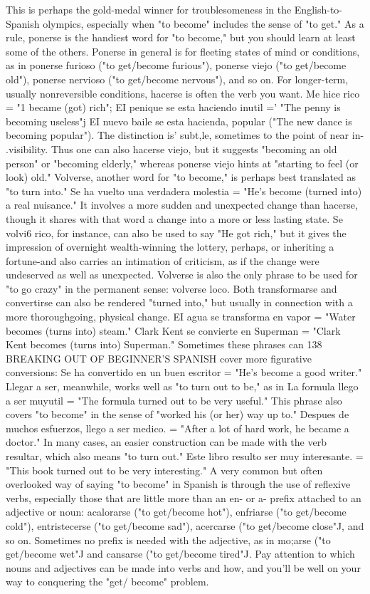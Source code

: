 This is perhaps the gold-medal winner for troublesomeness
in the English-to-Spanish olympics, especially when "to become" includes the sense of "to get." As a rule, ponerse is the handiest word for
"to become," but you should learn at least some of the others. Ponerse
in general is for fleeting states of mind or conditions, as in ponerse furioso ("to get/become furious"), ponerse viejo ("to get/become old"),
ponerse nervioso ("to get/become nervous"), and so on.
For longer-term, usually nonreversible conditions, hacerse is
often the verb you want. Me hice rico = "1 became (got) rich"; EI penique se esta haciendo inutil =' "The penny is becoming useless"j EI
nuevo baile se esta hacienda, popular ("The new dance is becoming
popular"). The distinction is' subt,le, sometimes to the point of near in-
.visibility. Thus one can also hacerse viejo, but it suggests "becoming
an old person" or "becoming elderly," whereas ponerse viejo hints at
"starting to feel (or look) old."
Volverse, another word for "to become," is perhaps best translated as "to turn into." Se ha vuelto una verdadera molestia = "He's
become (turned into) a real nuisance." It involves a more sudden and
unexpected change than hacerse, though it shares with that word a
change into a more or less lasting state. Se volvi6 rico, for instance,
can also be used to say "He got rich," but it gives the impression of
overnight wealth-winning the lottery, perhaps, or inheriting a fortune-and also carries an intimation of criticism, as if the change were
undeserved as well as unexpected. Volverse is also the only phrase to
be used for "to go crazy" in the permanent sense: volverse loco.
Both transformarse and convertirse can also be rendered
"turned into," but usually in connection with a more thoroughgoing,
physical change. EI agua se transforma en vapor = "Water becomes
(turns into) steam." Clark Kent se convierte en Superman = "Clark
Kent becomes (turns into) Superman." Sometimes these phrases can
138 BREAKING OUT OF BEGINNER'S SPANISH
cover more figurative conversions: Se ha convertido en un buen escritor = "He's become a good writer." Llegar a ser, meanwhile, works
well as "to turn out to be," as in La formula llego a ser muyutil =
"The formula turned out to be very useful." This phrase also covers
"to become" in the sense of "worked his (or her) way up to." Despues
de muchos esfuerzos, llego a ser medico. = "After a lot of hard work,
he became a doctor." In many cases, an easier construction can be
made with the verb resultar, which also means "to turn out." Este libro resulto ser muy interesante. = "This book turned out to be very
interesting."
A very common but often overlooked way of saying "to become" in Spanish is through the use of reflexive verbs, especially those
that are little more than an en- or a- prefix attached to an adjective or
noun: acalorarse ("to get/become hot"), enfriarse ("to get/become
cold"), entristecerse ("to get/become sad"), acercarse ("to get/become
close"J, and so on. Sometimes no prefix is needed with the adjective,
as in mo;arse ("to get/become wet"J and cansarse ("to get/become
tired"J. Pay attention to which nouns and adjectives can be made into
verbs and how, and you'll be well on your way to conquering the "get/
become" problem.

